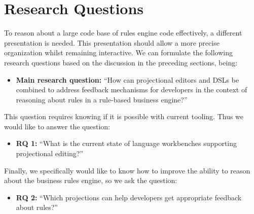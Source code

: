 \section{Research Questions}
\label{section:Research_Questions}

To reason about a large code base of rules engine code effectively, a different presentation is needed.
This presentation should allow a more precise organization whilst remaining interactive.
We can formulate the following research questions based on the discussion in the preceding sections, being:

\begin{itemize}
    \item \textbf{Main research question:} ``How can projectional editors and DSLs be combined to address feedback mechanisms for developers in the context of reasoning about rules in a rule-based business engine?''
\end{itemize}

This question requires knowing if it is possible with current tooling. Thus we would like to answer the question:
\begin{itemize}
    \item \textbf{RQ 1:} ``What is the current state of language workbenches supporting projectional editing?''
\end{itemize}

Finally, we specifically would like to know how to improve the ability to reason about the business rules engine, so we ask the question:
\begin{itemize}
    \item \textbf{RQ 2:} ``Which projections can help developers get appropriate feedback about rules?''
\end{itemize}
